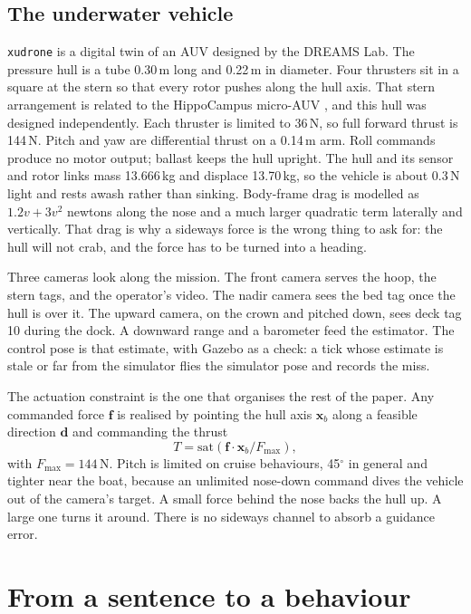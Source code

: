 \documentclass[conference]{IEEEtran}
\def\xudrone{\texttt{xudrone}}
\begin{document}
\subsection{The underwater vehicle}
\xudrone{} is a digital twin of an AUV designed by the DREAMS Lab. The pressure hull is a tube 0.30\,m long and 0.22\,m in diameter. Four thrusters sit in a square at the stern so that every rotor pushes along the hull axis. That stern arrangement is related to the HippoCampus micro-AUV \cite{hackbarth2015}, and this hull was designed independently. Each thruster is limited to 36\,N, so full forward thrust is 144\,N. Pitch and yaw are differential thrust on a 0.14\,m arm. Roll commands produce no motor output; ballast keeps the hull upright. The hull and its sensor and rotor links mass 13.666\,kg and displace 13.70\,kg, so the vehicle is about 0.3\,N light and rests awash rather than sinking. Body-frame drag is modelled as $1.2v + 3v^{2}$ newtons along the nose and a much larger quadratic term laterally and vertically. That drag is why a sideways force is the wrong thing to ask for: the hull will not crab, and the force has to be turned into a heading.

Three cameras look along the mission. The front camera serves the hoop, the stern tags, and the operator's video. The nadir camera sees the bed tag once the hull is over it. The upward camera, on the crown and pitched down, sees deck tag 10 during the dock. A downward range and a barometer feed the estimator. The control pose is that estimate, with Gazebo as a check: a tick whose estimate is stale or far from the simulator flies the simulator pose and records the miss.

The actuation constraint is the one that organises the rest of the paper. Any commanded force $\mathbf{f}$ is realised by pointing the hull axis $\mathbf{x}_{b}$ along a feasible direction $\mathbf{d}$ and commanding the thrust
\begin{equation}
T = \mathrm{sat}\!\left(\mathbf{f}\cdot\mathbf{x}_{b} / F_{\max}\right),
\label{eq:thrust}
\end{equation}
with $F_{\max}=144\,\mathrm{N}$. Pitch is limited on cruise behaviours, 45$^\circ$ in general and tighter near the boat, because an unlimited nose-down command dives the vehicle out of the camera's target. A small force behind the nose backs the hull up. A large one turns it around. There is no sideways channel to absorb a guidance error.

\section{From a sentence to a behaviour}
\label{sec:coral}
\end{document}
